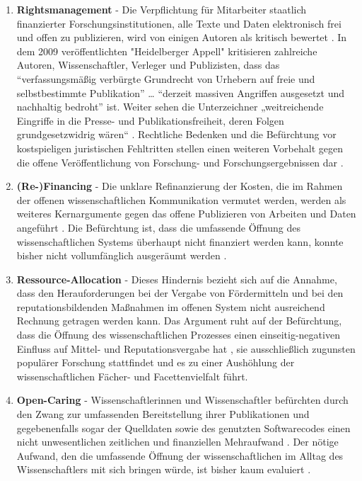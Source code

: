 \begin{enumerate}
\item \textbf{Rightsmanagement} - Die Verpflichtung für Mitarbeiter staatlich finanzierter Forschungsinstitutionen, alle Texte und Daten elektronisch frei und offen zu publizieren, wird von einigen Autoren als kritisch bewertet \cite{suchen}. In dem 2009 veröffentlichten "Heidelberger Appell" \cite{faz_heidelberger_apell_2009} kritisieren zahlreiche Autoren, Wissenschaftler, Verleger und Publizisten, dass das “verfassungsmäßig verbürgte Grundrecht von Urhebern auf freie und selbstbestimmte Publikation” … “derzeit massiven Angriffen ausgesetzt und nachhaltig bedroht” ist. Weiter sehen die Unterzeichner „weitreichende Eingriffe in die Presse- und Publikationsfreiheit, deren Folgen grundgesetzwidrig wären“ \cite{ITK_2009}. Rechtliche Bedenken und die Befürchtung vor kostspieligen juristischen Fehltritten stellen einen weiteren Vorbehalt gegen die offene Veröffentlichung von Forschung- und Forschungsergebnissen dar \cite{weishaupt_2009_goldenOA}.
\item \textbf{(Re-)Financing} - Die unklare Refinanzierung der Kosten, die im Rahmen der offenen wissenschaftlichen Kommunikation vermutet werden, werden als weiteres Kernargumente gegen das offene Publizieren von Arbeiten und Daten angeführt \cite{Chibnik_2015}. Die Befürchtung ist, dass die umfassende Öffnung des wissenschaftlichen Systems überhaupt nicht finanziert werden kann, konnte bisher nicht vollumfänglich ausgeräumt werden \cite{weishaupt_2009_goldenOA}.
\item \textbf{Ressource-Allocation} - Dieses Hindernis bezieht sich auf die Annahme, dass den Herauforderungen bei der Vergabe von Fördermitteln und bei den reputationsbildenden Maßnahmen im offenen System nicht ausreichend Rechnung getragen werden kann. Das Argument ruht auf der Befürchtung, dass die Öffnung des wissenschaftlichen Prozesses einen einseitig-negativen Einfluss auf Mittel- und Reputationsvergabe hat \cite{grand_2012_open}, sie ausschließlich zugunsten populärer Forschung stattfindet und es zu einer Aushöhlung der wissenschaftlichen Fächer- und Facettenvielfalt führt.
\item \textbf{Open-Caring} - Wissenschaftlerinnen und Wissenschaftler befürchten durch den Zwang zur umfassenden Bereitstellung ihrer Publikationen und gegebenenfalls sogar der Quelldaten sowie des genutzten Softwarecodes einen nicht unwesentlichen zeitlichen und finanziellen Mehraufwand \cite{bbaw_publizieren_2015} \cite{mennes_2013_making_os} \cite{grand_2012_open}. Der nötige Aufwand, den die umfassende Öffnung der wissenschaftlichen im Alltag des Wissenschaftlers mit sich bringen würde, ist bisher kaum evaluiert \cite{osterloh2008anreize}.

\end{enumerate}
